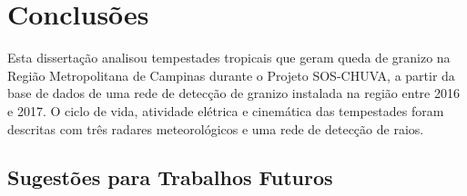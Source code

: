 \chapter{Conclusões}\label{conclusoes}

Esta dissertação analisou tempestades tropicais que geram queda de granizo na Região Metropolitana de Campinas durante o Projeto SOS-CHUVA, a partir da base de dados de uma rede de detecção de granizo instalada na região entre 2016 e 2017. O ciclo de vida, atividade elétrica e cinemática das tempestades foram descritas com três radares meteorológicos e uma rede de detecção de raios.



\section{Sugestões para Trabalhos Futuros}\label{sugestoes}